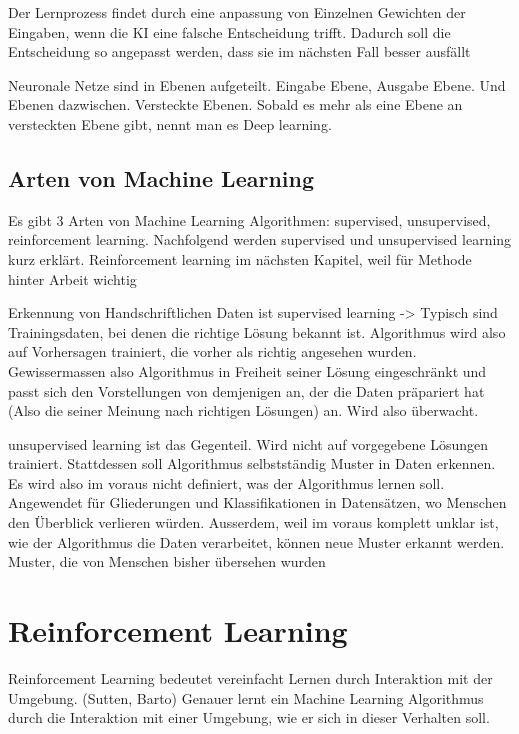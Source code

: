 Der Lernprozess findet durch eine anpassung von Einzelnen Gewichten der
Eingaben, wenn die KI eine falsche Entscheidung trifft. Dadurch soll die
Entscheidung so angepasst werden, dass sie im nächsten Fall besser ausfällt

Neuronale Netze sind in Ebenen aufgeteilt. Eingabe Ebene, Ausgabe Ebene. Und
Ebenen dazwischen. Versteckte Ebenen. Sobald es mehr als eine Ebene an
versteckten Ebene gibt, nennt man es Deep learning.

\subsection*{Arten von Machine Learning}

Es gibt 3 Arten von Machine Learning Algorithmen: supervised, unsupervised, reinforcement
learning. Nachfolgend werden supervised und unsupervised learning kurz erklärt.
Reinforcement learning im nächsten Kapitel, weil für Methode hinter Arbeit
wichtig

Erkennung von Handschriftlichen Daten ist supervised learning ->
Typisch sind Trainingsdaten, bei denen die richtige Lösung bekannt ist.
Algorithmus wird also auf Vorhersagen trainiert, die vorher als richtig
angesehen wurden. Gewissermassen also Algorithmus in Freiheit seiner Lösung
eingeschränkt und passt sich den Vorstellungen von demjenigen an, der die Daten präpariert hat (Also die seiner Meinung nach richtigen Lösungen) an. Wird also überwacht.

unsupervised learning ist das Gegenteil. Wird nicht auf vorgegebene Lösungen
trainiert. Stattdessen soll Algorithmus selbstständig Muster in Daten erkennen.
Es wird also im voraus nicht definiert, was der Algorithmus lernen soll.
Angewendet für Gliederungen und Klassifikationen in Datensätzen, wo Menschen den
Überblick verlieren würden. Ausserdem, weil im voraus komplett unklar ist, wie
der Algorithmus die Daten verarbeitet, können neue Muster erkannt werden.
Muster, die von Menschen bisher übersehen wurden 


\section{Reinforcement Learning}
\label{chap:t_rl}

Reinforcement Learning bedeutet vereinfacht Lernen durch Interaktion mit der
Umgebung. (Sutten, Barto)  Genauer lernt ein Machine Learning Algorithmus durch
die Interaktion mit einer Umgebung, wie er sich in dieser Verhalten soll.

